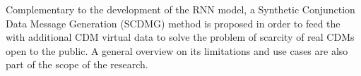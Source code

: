 Complementary to the development of the RNN model, a Synthetic Conjunction Data Message Generation (SCDMG) method is proposed in order to feed the  with additional CDM virtual data to solve the problem of scarcity of real CDMs open to the public. A general overview on its limitations and use cases are also part of the scope of the research.






